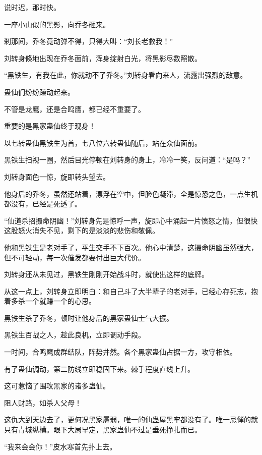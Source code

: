 
\begin{this_body}



说时迟，那时快。

一座小山似的黑影，向乔冬砸来。

刹那间，乔冬竟动弹不得，只得大叫：“刘长老救我！”

刘转身倏地出现在乔冬面前，浑身绽射白光，将黑影尽数照散。

“黑铁生，有我在此，你就动不了乔冬。”刘转身看向来人，流露出强烈的敌意。

蛊仙们纷纷躁动起来。

不管是龙鹰，还是合鸣鹰，都已经不重要了。

重要的是黑家蛊仙终于现身！

以七转蛊仙黑铁生为首，七八位六转蛊仙随后，站在众仙面前。

黑铁生扫视一圈，然后目光停顿在刘转身的身上，冷冷一笑，反问道：“是吗？”

刘转身面色一惊，旋即转头望去。

他身后的乔冬，虽然还站着，漂浮在空中，但脸色凝滞，全是惊恐之色，一点生机都没有，已经是死透了。

“仙道杀招摄命阴幽！”刘转身先是惊呼一声，旋即心中涌起一片愤怒之情，但很快这股怒火消失不见，剩下的是淡淡的悲伤和敬佩。

他和黑铁生是老对手了，平生交手不下百次。他心中清楚，这摄命阴幽虽然强大，但不可轻动，每一次催发都要付出巨大代价。

刘转身还从未见过，黑铁生刚刚开始战斗时，就使出这样的底牌。

从这一点上，刘转身立即明白：和自己斗了大半辈子的老对手，已经心存死志，抱着多杀一个就赚一个的心思。

黑铁生杀了乔冬，顿时让他身后的黑家蛊仙士气大振。

黑铁生百战之人，趁此良机，立即调动手段。

一时间，合鸣鹰成群结队，阵势井然。各个黑家蛊仙占据一方，攻守相依。

有了蛊仙调动，第二防线立即稳固下来。棘手程度直线上升。

这可惹恼了围攻黑家的诸多蛊仙。

阻人财路，如杀人父母！

这仇大到天边去了，更何况黑家孱弱，唯一的仙蛊屋黑牢都没有了。唯一忌惮的就只有青城纵横。眼下大局早定，黑家蛊仙不过是垂死挣扎而已。

“我来会会你！”皮水寒首先扑上去。


\end{this_body}

